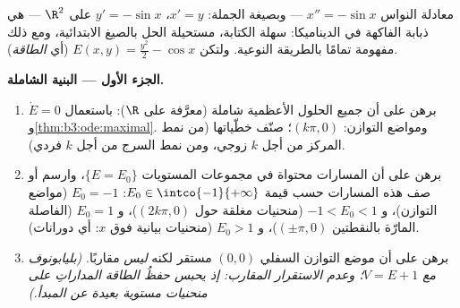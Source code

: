 \begin{problem}\label{pb:b3:ode:1}
معادلة النواس $x'' = -\sin x$ --- وبصيغة الجملة: $x' =
y$،
$y' = -\sin x$ على $\R^2$ --- هي ذبابة الفاكهة في الديناميكا:
سهلة الكتابة، مستحيلة الحل بالصيغ الابتدائية، ومع ذلك مفهومة
تمامًا بالطريقة النوعية. ولتكن $E(x, y) = \frac{y^2}2 - \cos x$ (أي \emph{الطاقة}).

\medskip
\noindent\textbf{الجزء الأول --- البنية الشاملة.}
\begin{enumerate}
  \item برهن على أن جميع الحلول الأعظمية شاملة (معرَّفة على
        $\R$): باستعمال $\dot E = 0$ و\cref{thm:b3:ode:maximal}. ومواضع
        التوازن: $(k\pi, 0)$؛ صنّف خطّياتها (من نمط المركز من
        أجل $k$ زوجي، ومن نمط السرج من أجل $k$ فردي).
  \item برهن على أن المسارات محتواة في مجموعات المستويات
        $\{E = E_0\}$، وارسم أو صف هذه المسارات حسب قيمة
        $E_0 \in \intco{-1}{+\infty}$: $E_0 = -1$ (مواضع التوازن)، و $-1 < E_0 < 1$
        (منحنيات مغلقة حول $(2k\pi, 0)$)، و $E_0 = 1$ (الفاصلة
        المارّة بالنقطتين $(\pm\pi, 0)$)، و $E_0 > 1$ (منحنيات بيانية
        فوق $x$: أي دورانات).
  \item برهن على أن موضع التوازن السفلي $(0,0)$ مستقر لكنه
        \emph{ليس}  مقاربًا. \emph{(بليابونوف مع
        $V = E + 1$؛ وعدم الاستقرار المقارب: إذ يحبس حفظُ
        الطاقة المداراتِ على منحنيات مستوية بعيدة عن المبدأ.)}
\end{enumerate}


\end{problem}
